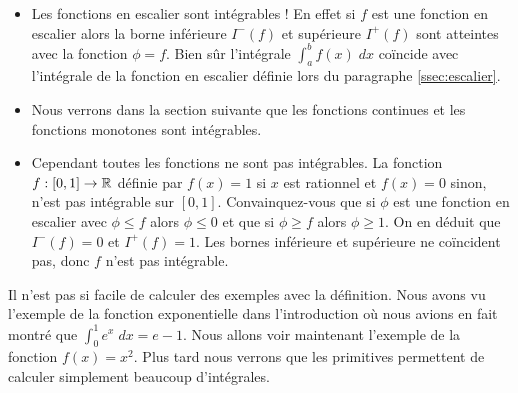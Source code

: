 \documentclass[class=report,crop=false]{standalone}
\begin{document}
\begin{exemple}
\sauteligne
\begin{itemize}
  \item Les fonctions en escalier sont intégrables ! En effet si $f$ est une fonction en escalier
alors la borne inférieure $I^-(f)$ et supérieure $I^+(f)$ sont atteintes avec la fonction
$\phi=f$. Bien sûr l'intégrale $\int_a^b f(x)\; dx$ coïncide avec l'intégrale de la fonction
en escalier définie lors du paragraphe \ref{ssec:escalier}.


  \item Nous verrons dans la section suivante que les fonctions continues
et les fonctions monotones sont intégrables.

  \item Cependant toutes les fonctions ne sont pas intégrables. La fonction $f : [0,1] \to \mathbb{R}$ définie par
$f(x)=1$ si $x$ est rationnel et $f(x)=0$ sinon, n'est pas intégrable sur $[0,1]$.
Convainquez-vous que si $\phi$ est une fonction en escalier avec $\phi \le f$ alors $\phi \le 0$
et que si $\phi \ge f$ alors $\phi \ge 1$. On en déduit que $I^-(f)=0$ et $I^+(f)=1$.
Les bornes inférieure et supérieure ne coïncident pas, donc $f$ n'est pas intégrable.


\end{itemize}
\end{exemple}


Il n'est pas si facile de calculer des exemples avec la définition.
Nous avons vu l'exemple de la fonction exponentielle dans l'introduction
où nous avions en fait montré que
$\int_0^1 e^x \; dx = e-1$. Nous allons voir maintenant
l'exemple de la fonction $f(x)=x^2$.
Plus tard nous verrons que les primitives permettent de calculer simplement
beaucoup d'intégrales.
\end{document}
